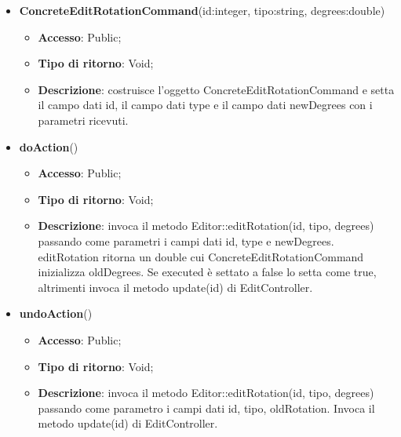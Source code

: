 {{{	
	\begin{itemize}
		\item \textbf{ConcreteEditRotationCommand}(id:integer, tipo:string, degrees:double)
		\begin{itemize}
			\item \textbf{Accesso}: Public;
			\item \textbf{Tipo di ritorno}: Void;
			\item \textbf{Descrizione}: costruisce l’oggetto ConcreteEditRotationCommand e setta il campo dati id, il campo dati type e il campo dati newDegrees con i parametri ricevuti.
		\end{itemize}
		\item \textbf{doAction}()
		\begin{itemize}
			\item \textbf{Accesso}: Public;
			\item \textbf{Tipo di ritorno}: Void;
			\item \textbf{Descrizione}: invoca il metodo Editor::editRotation(id, tipo, degrees) passando come parametri i campi dati id, type e newDegrees. editRotation ritorna un double cui ConcreteEditRotationCommand inizializza oldDegrees. Se executed è settato a false lo setta come true, altrimenti invoca il metodo update(id) di EditController.
		\end{itemize}
		\item \textbf{undoAction}()
		\begin{itemize}
			\item \textbf{Accesso}: Public;
			\item \textbf{Tipo di ritorno}: Void;
			\item \textbf{Descrizione}: invoca il metodo Editor::editRotation(id, tipo, degrees) passando come parametro i campi dati id, tipo, oldRotation. Invoca il metodo update(id) di EditController.
		\end{itemize}
	\end{itemize}
	}
}}
